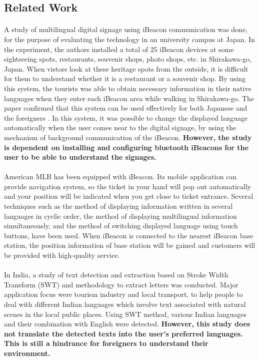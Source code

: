 \documentclass[12pt]{article}
\begin{document}
\subsection{Related Work}

\paragraph{} A study of multilingual digital signage using iBeacon communication was done, for the purpose of evaluating the technology in an university campus at Japan.  \cite{one} In the experiment, the authors installed a total of 25 iBeacon devices at some sightseeing spots, restaurants, souvenir shops, photo shops, etc. in Shirakawa-go, Japan. When vistors look at these heritage spots from the outside, it is difficult for them to understand whether it is a restaurant or a souvenir shop. By using this system, the tourists was able to obtain necessary information in their native languages when they enter each iBeacon area while walking in Shirakawa-go. The paper confirmed that this system can be used effectively for both Japanese and the foreigners \cite{one}.  In this system, it was possible to change the displayed language automatically when the user comes near to the digital signage, by using the mechanism of background communication of the iBeacon. \textbf{However, the study is dependent on installing and configuring bluetooth iBeacons for the user to be able to understand the signages.}

\paragraph{}American MLB has been equipped with iBeacon. Its mobile application can provide navigation system, so the ticket in your hand will pop out automatically and your position will be indicated when you get close to ticket entrance. Several techniques such as the method of displaying information written in several languages in cyclic order, the method of displaying multilingual information simultaneously, and the method of switching displayed language using touch buttons, have been used. \cite{zoo} When iBeacon is connected to the nearest iBeacon base station, the position information of base station will be gained and customers will be provided with high-quality service.\cite{taiwan} \cite{room}

\paragraph{}In India, a study of text detection and extraction based on Stroke Width Transform (SWT) and methodology to extract letters was conducted. \cite{india} Major application focus were tourism industry and local transport, to help people to deal with different Indian languages which involve text associated with natural scenes in the local public places. Using SWT method, various Indian languages and their combination with English were detected. \textbf{However, this study does not translate the detected texts into the user's preferred languages. This is still a hindrance for foreigners to understand their environment.}
\end{document}
